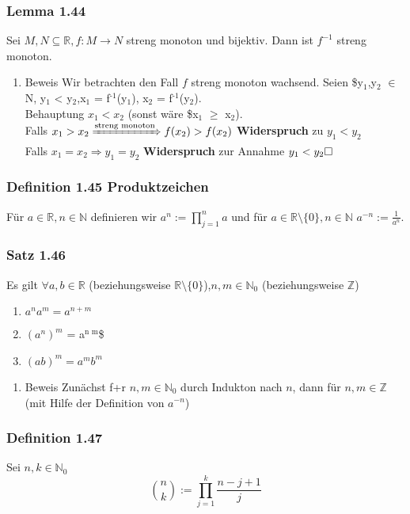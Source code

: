 \documentclass[11pt]{article}
\DeclareMathOperator{\Forall}{\forall}%
\begin{document}
\subsubsection{Lemma 1.44}
\label{sec-2-9-11}
Sei $M,N \subseteq \mathbb{R}, f:M\to N$ streng monoton und bijektiv. Dann ist $f^{-1}$ streng monoton.
\begin{enumerate}
\item Beweis
\label{sec-2-9-11-1}
Wir betrachten den Fall $f$ streng monoton wachsend. Seien \$y$_{\text{1}}$,y$_{\text{2}}$ $\in$ N, y$_{\text{1}}$ < y$_{\text{2}}$,x$_{\text{1}}$ = f$^{\text{-1}}$(y$_{\text{1}}$), x$_{\text{2}}$ = f$^{\text{-1}}$(y$_{\text{2}}$). \\
     Behauptung $x_1 < x_2$ (sonst wäre \$x$_{\text{1}}$ $\ge$ x$_{\text{2}}$). \\
     Falls $x_1 > x_2 \xRightarrow{\text{streng monoton}} f(x_2) > f(x_2)$ \textbf{Widerspruch} zu $y_1 < y_2$ \\
     Falls $x_1 = x_2 \Rightarrow y_1 = y_2$ \textbf{Widerspruch} zur Annahme $y_1 < y_2 \hfill \square$
\end{enumerate}
\subsubsection{Definition 1.45 Produktzeichen}
\label{sec-2-9-12}
Für $a\in\mathbb{R},n\in\mathbb{N}$ definieren wir $a^n := \prod_{j=1}^n a$ und für $a\in\mathbb{R}\setminus\{0\},n\in\mathbb{N}$ $a^{-n} := \frac{1}{a^n}$.
\subsubsection{Satz 1.46}
\label{sec-2-9-13}
Es gilt $\Forall a,b\in\mathbb{R}$ (beziehungsweise $\mathbb{R}\setminus \{0\}$),$n,m\in\mathbb{N}_0$ (beziehungsweise $\mathbb{Z}$)
\begin{enumerate}
\item $a^n a^m = a^{n+m}$
\item $(a^n)^m$ = a$^{\text{n m}}$\$
\item $(ab)^m = a^m b^m$
\end{enumerate}
\begin{enumerate}
\item Beweis
\label{sec-2-9-13-1}
Zunächst f+r $n,m\in\mathbb{N}_0$ durch Indukton nach $n$, dann für $n,m\in\mathbb{Z}$ (mit Hilfe der Definition von $a^{-n}$)
\end{enumerate}
\subsubsection{Definition 1.47}
\label{sec-2-9-14}
Sei $n,k\in\mathbb{N}_0$ \[\binom{n}{k}:=\prod_{j=1}^k \frac{n -j + 1}{j}\]
\end{document}
